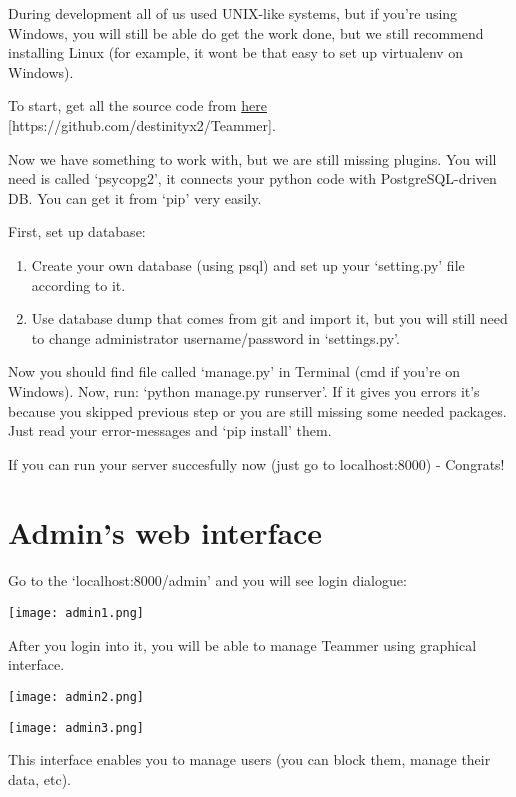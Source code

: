 \documentclass{report}
\begin{document}
During development all of us used UNIX-like systems, but if you’re using Windows, you will still be able do get the work done, but we still recommend installing Linux (for example, it wont be that easy to set up virtualenv on Windows).

To start, get all the source code from \href{https://github.com/destinityx2/Teammer}{here} [https://github.com/destinityx2/Teammer].

Now we have something to work with, but we are still missing plugins. You will need is called ‘psycopg2’, it connects your python code with PostgreSQL-driven DB. You can get it from ‘pip’ very easily.

First, set up database:
\begin{enumerate}
\item Create your own database (using psql) and set up your ‘setting.py’ file according to it.
\item Use database dump that comes from git and import it, but you will still need to change administrator username/password in ‘settings.py’.
\end{enumerate}

Now you should find file called ‘manage.py’ in Terminal (cmd if you’re on Windows).
Now, run: ‘python manage.py runserver’.
If it gives you errors it’s because you skipped previous step or you are still missing some needed packages. Just read your error-messages and ‘pip install’ them.

If you can run your server succesfully now (just go to localhost:8000) - Congrats!

\section{Admin’s web interface}
Go to the ‘localhost:8000/admin’ and you will see login dialogue:
\begin{center}
\texttt{[image: admin1.png]}
\end{center}
After you login into it, you will be able to manage Teammer using graphical interface.
\begin{center}
\texttt{[image: admin2.png]}
\end{center}
\begin{center}
\texttt{[image: admin3.png]}
\end{center}

This interface enables you to manage users (you can block them, manage their data, etc).
\end{document}
